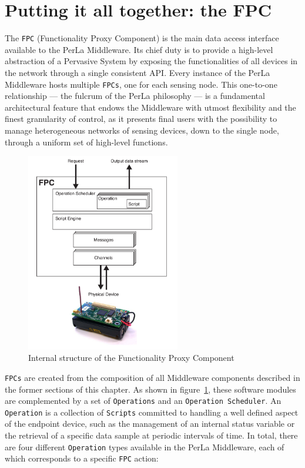 \section{Putting it all together: the FPC}

The \texttt{FPC} (Functionality Proxy Component) is the main data access
interface available to the PerLa Middleware. Its chief duty is to provide a
high-level abstraction of a Pervasive System by exposing the functionalities of
all devices in the network through a single consistent API. Every instance of
the PerLa Middleware hosts multiple \texttt{FPCs}, one for each sensing node.
This one-to-one relationship --- the fulcrum of the PerLa philosophy --- is a
fundamental architectural feature that endows the Middleware with utmost
flexibility and the finest granularity of control, as it presents final users
with the possibility to manage heterogeneous networks of sensing devices, down
to the single node, through a uniform set of high-level functions.

\begin{figure}[h!]
\center
\includegraphics[width=0.6\textwidth]{imgs/fpc.pdf}
\caption{Internal structure of the Functionality Proxy Component}
\label{fig:fpc}
\end{figure}

\texttt{FPCs} are created from the composition of all Middleware components
described in the former sections of this chapter. As shown in
figure~\ref{fig:fpc}, these software modules are complemented by a set of
\texttt{Operations} and an \texttt{Operation Scheduler}. An \texttt{Operation}
is a collection of \texttt{Scripts} committed to handling a well defined aspect
of the endpoint device, such as the management of an internal status variable
or the retrieval of a specific data sample at periodic intervals of time. In
total, there are four different \texttt{Operation} types available in the PerLa
Middleware, each of which corresponds to a specific \texttt{FPC} action:

